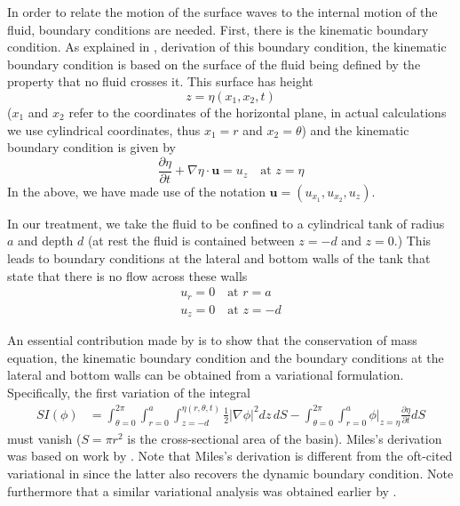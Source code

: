 In order to relate the motion of the surface waves to the internal motion of the fluid, boundary conditions are needed. First, there is the kinematic boundary condition. As explained in \citet{whitham74:_linear}, derivation of this boundary condition, the kinematic boundary condition is based on the surface of the fluid being defined by the property that no fluid crosses it. This surface has height
\begin{equation}
z = \eta (x_1, x_2, t)
\end{equation}
($x_1$ and $x_2$ refer to the coordinates of the horizontal plane, in actual calculations we use cylindrical coordinates, thus $x_1 = r$ and $x_2 = \theta$) and the kinematic boundary condition is given by
\begin{equation}
\frac{\partial \eta}{\partial t} + \nabla \eta \cdot \boldsymbol{u} = u_z \quad \text{at } z = \eta
\end{equation}
In the above, we have made use of the notation $\boldsymbol{u} = (u_{x_1}, u_{x_2}, u_z )$.

In our treatment, we take the fluid to be confined to a cylindrical tank of radius $a$ and depth $d$ (at rest the fluid is contained between $z = -d$ and $z = 0$.) This leads to boundary conditions at the lateral and bottom walls of the tank that state that there is no flow across these walls
\begin{gather*}
u_r = 0 \quad \text{at } r = a\\
u_z = 0 \quad \text{at } z = - d
\end{gather*}

An essential contribution made by \citet{miles76:_nonlin} is to show that the conservation of mass equation, the kinematic boundary condition and the boundary conditions at the lateral and bottom walls can be obtained from a variational formulation. Specifically, the first variation of the integral
\begin{equation}
\begin{split}
SI (\phi)& = \int_{\theta = 0}^{2 \pi} \int_{r = 0}^a \int_{z = - d}^{\eta ( r, \theta, t )} \frac12 | \nabla \phi |^2 dz \, dS - \int_{\theta = 0}^{2 \pi} \int_{r = 0}^a  \phi |_{z = \eta} \frac{\partial \eta}{\partial t} dS
\end{split}
\end{equation}
must vanish ($S = \pi r^2$ is the cross-sectional area of the basin). Miles's derivation was based on work by \citet{serrin59:_encyc_physic}. Note that Miles's derivation is different from the oft-cited variational in \citet{luke67:_variat_princ_for_fluid_with_free_surfac} since the latter also recovers the dynamic boundary condition. Note furthermore that a similar variational analysis was obtained earlier by \citet{zakharov68:_stabil_of_period_waves}.

